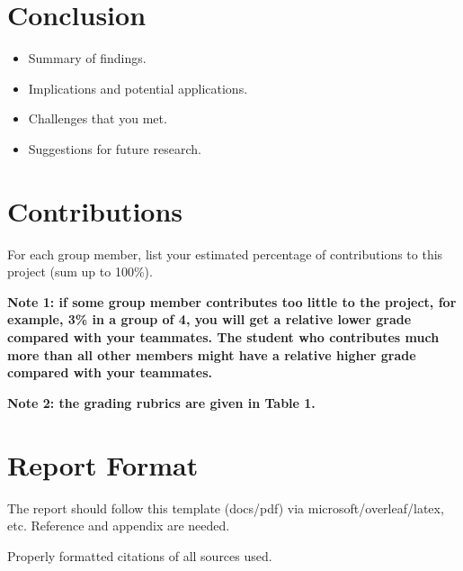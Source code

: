 \documentclass{article}
\begin{document}
\section{Conclusion}
\begin{itemize}
    \item Summary of findings.
    \item Implications and potential applications.
    \item Challenges that you met.
    \item Suggestions for future research.
\end{itemize}


\section{Contributions}

For each group member, list your estimated percentage of contributions to this project (sum up to 100\%). 
\newline

\textbf{Note 1: if some group member contributes too little to the project, for example, 3\% in a group of 4, you will get a relative lower grade compared with your teammates. The student who contributes much more than all other members might have a relative higher grade compared with your teammates.}

\textbf{Note 2: the grading rubrics are given in Table 1.}

\section{Report Format}
The report should follow this template (docs/pdf) via microsoft/overleaf/latex, etc. Reference and appendix are needed. 



Properly formatted citations of all sources used.
\end{document}
